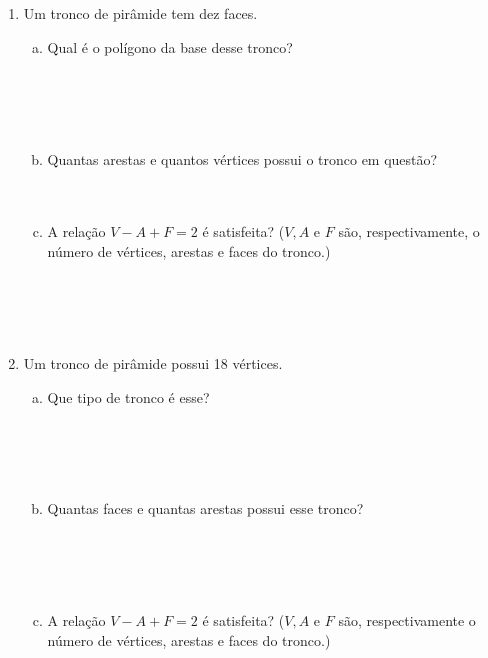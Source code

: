 \documentclass[a4paper,14pt]{article}
\begin{document}
\begin{multicols}{2}
\begin{enumerate}
			\item Um tronco de pirâmide tem dez faces.
			\begin{enumerate}[a)]
				\item Qual é o polígono da base desse tronco? \\\\\\\\\\
				\item Quantas arestas e quantos vértices possui o tronco em questão? \\\\\\
				\item A relação $V - A + F = 2$ é satisfeita? ($V, A$ e $F$ são, respectivamente, o número de vértices, arestas e faces do tronco.) \\\\\\\\\\
			\end{enumerate}
		    \item Um tronco de pirâmide possui 18 vértices.
		    \begin{enumerate}[a)]
		    	\item Que tipo de tronco é esse? \\\\\\\\\\
		    	\item Quantas faces e quantas arestas possui esse tronco? \\\\\\\\\\
		    	\item A relação $V - A + F = 2$ é satisfeita? ($V, A$ e $F$ são, respectivamente o número de vértices, arestas e faces do tronco.)
		    \end{enumerate}
        \end{enumerate}

\end{multicols}
\end{document}
